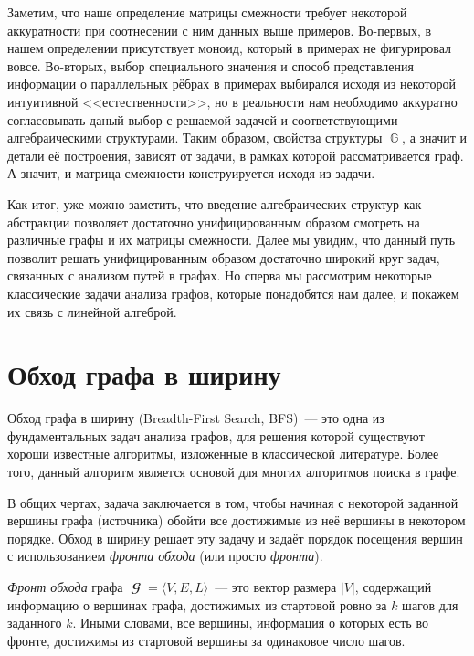 Заметим, что наше определение матрицы смежности требует некоторой аккуратности при соотнесении с ним данных выше примеров.
Во-первых, в нашем определении присутствует моноид, который в примерах не фигурировал вовсе.
Во-вторых, выбор специального значения и способ представления информации о параллельных рёбрах в примерах выбирался исходя из некоторой интуитивной <<естественности>>, но в реальности нам необходимо аккуратно согласовывать даный выбор с решаемой задачей и соответствующими алгебраическими структурами.
Таким образом, свойства структуры $\BbbG$, а значит и детали её построения, зависят от задачи, в рамках которой рассматривается граф.
А значит, и матрица смежности конструируется исходя из задачи.

Как итог, уже можно заметить, что введение алгебраических структур как абстракции позволяет достаточно унифицированным образом смотреть на различные графы и их матрицы смежности.
Далее мы увидим, что данный путь позволит решать унифицированным образом достаточно широкий круг задач, связанных с анализом путей в графах.
Но сперва мы рассмотрим некоторые классические задачи анализа графов, которые понадобятся нам далее, и покажем их связь с линейной алгеброй.

\section{Обход графа в ширину}

Обход графа в ширину (Breadth-First Search, BFS)~--- это одна из фундаментальных задач анализа графов, для решения которой существуют хороши известные алгоритмы, изложенные в классической литературе.
Более того, данный алгоритм является основой для многих алгоритмов поиска в графе.

В общих чертах, задача заключается в том, чтобы начиная с некоторой заданной вершины графа (источника) обойти все достижимые из неё вершины в некотором порядке.
Обход в ширину решает эту задачу и задаёт порядок посещения вершин с использованием \emph{фронта обхода} (или просто \emph{фронта}).
\begin{definition}
    \emph{Фронт обхода} графа $\mbfscrG = \langle V, E, L \rangle$~--- это вектор размера $|V|$, содержащий информацию%
    о вершинах графа, достижимых из стартовой ровно за $k$ шагов для заданного $k$.
    Иными словами, все вершины, информация о которых есть во фронте, достижимы из стартовой вершины за одинаковое число шагов.
\end{definition}

